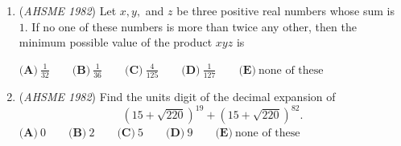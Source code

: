 \begin{enumerate}
	\item (\textit{AHSME 1982}) Let $x,y,$ and $z$ be three positive real numbers whose sum is $1.$ If no one of these numbers is more than twice any other, 
then the minimum possible value of the product $xyz$ is 


 $\textbf{(A)}\ \frac{1}{32}\qquad \textbf{(B)}\ \frac{1}{36}\qquad \textbf{(C)}\ \frac{4}{125}\qquad \textbf{(D)}\ \frac{1}{127}\qquad \textbf{(E)}\ \text{none of these}$


	\item (\textit{AHSME 1982}) Find the units digit of the decimal expansion of 
 \[\left(15 + \sqrt{220}\right)^{19} + \left(15 + \sqrt{220}\right)^{82}.\]
$\textbf{(A)}\ 0\qquad  \textbf{(B)}\ 2\qquad  \textbf{(C)}\ 5\qquad  \textbf{(D)}\ 9\qquad  \textbf{(E)}\ \text{none of these}$


\end{enumerate}